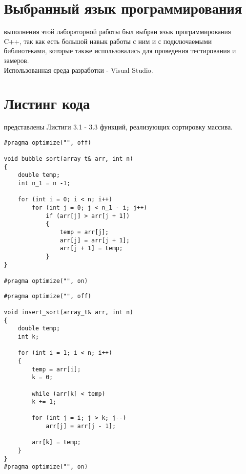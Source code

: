 \section{Выбранный язык программирования}
 выполнения этой лабораторной работы был выбран язык программирования C++, так как есть большой навык работы с ним и с подключаемыми библиотеками, которые также использовались для проведения тестирования и замеров.\\

Использованная среда разработки - Visual Studio.

\section{Листинг кода}
 представлены Листиги 3.1 - 3.3 функций, реализующих сортировку массива.
\begin{lstlisting}[label=code, caption = Сортировка пузырьком]
#pragma optimize("", off)

void bubble_sort(array_t& arr, int n)
{
	double temp;
	int n_1 = n -1;
	
	for (int i = 0; i < n; i++)
		for (int j = 0; j < n_1 - i; j++)
			if (arr[j] > arr[j + 1])
			{
				temp = arr[j];
				arr[j] = arr[j + 1];
				arr[j + 1] = temp;
			}
}

#pragma optimize("", on)
\end{lstlisting}

\begin{lstlisting}[label=code, caption = Сортировка вставками]
#pragma optimize("", off)

void insert_sort(array_t& arr, int n)
{
	double temp;
	int k;
	
	for (int i = 1; i < n; i++)
	{
		temp = arr[i];
		k = 0;
		
		while (arr[k] < temp)
		k += 1;
		
		for (int j = i; j > k; j--)
			arr[j] = arr[j - 1];
		
		arr[k] = temp;
	}
}
#pragma optimize("", on)
\end{lstlisting}

